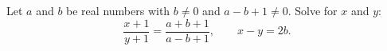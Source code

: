 Let $a$ and $b$ be real numbers with $b\ne0$ and $a-b+1\ne0$. Solve for $x$ and $y$:
\[
\dfrac{x+1}{y+1}=\dfrac{a+b+1}{a-b+1},\qquad x-y=2b .
\]
